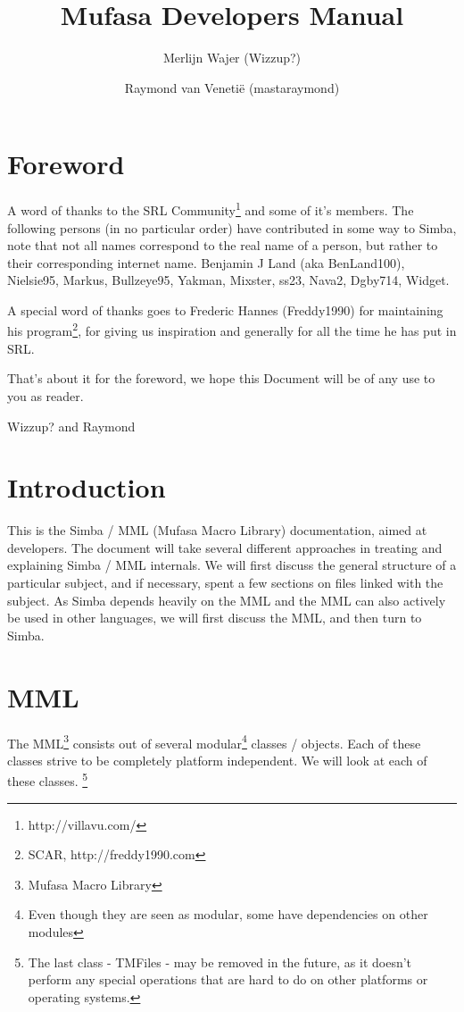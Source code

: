 \documentclass[a4paper, 10pt]{report} %
\begin{document}
\title{Mufasa Developers Manual}
\author{Merlijn Wajer (Wizzup?) \and Raymond van Veneti\"{e} (mastaraymond)}
\maketitle
\tableofcontents

\chapter{Foreword}

A word of thanks to the SRL Community\footnote{http://villavu.com/} and some of
it's members.
The following persons (in no particular order) have contributed in some way to
Simba, note that not all names correspond to the real name of a person, but
rather to their corresponding internet name.
Benjamin J Land (aka BenLand100), Nielsie95, Markus, Bullzeye95,
Yakman, Mixster, ss23, Nava2, Dgby714, Widget.

A special word of thanks goes to Frederic Hannes (Freddy1990) for maintaining
his program\footnote{SCAR, http://freddy1990.com}, for giving us inspiration
and generally for all the time he has put in SRL.

That's about it for the foreword, we hope this Document will be of any use to
you as reader.

Wizzup? and Raymond

\chapter{Introduction}

This is the Simba / MML (Mufasa Macro Library) documentation, aimed at
developers. The document will take several different approaches in treating and
explaining Simba / MML internals. We will first discuss the general 
structure of a particular subject, and if necessary, spent a few sections
on files linked with the subject. 
As Simba depends heavily on the MML and the MML can also actively be used in 
other languages, we will first discuss the MML, and then turn to Simba.

\chapter{MML}

The MML\footnote{Mufasa Macro Library} consists out of several
modular\footnote{Even though they are seen as modular, some have dependencies on
other modules} classes / objects. Each of these classes strive to be
completely platform independent. We will look at each of these classes.
\footnote{
The last class - TMFiles - may be removed in the future, as it doesn't
perform any special operations that are hard to do on other platforms or
operating systems.
}
\end{document}
